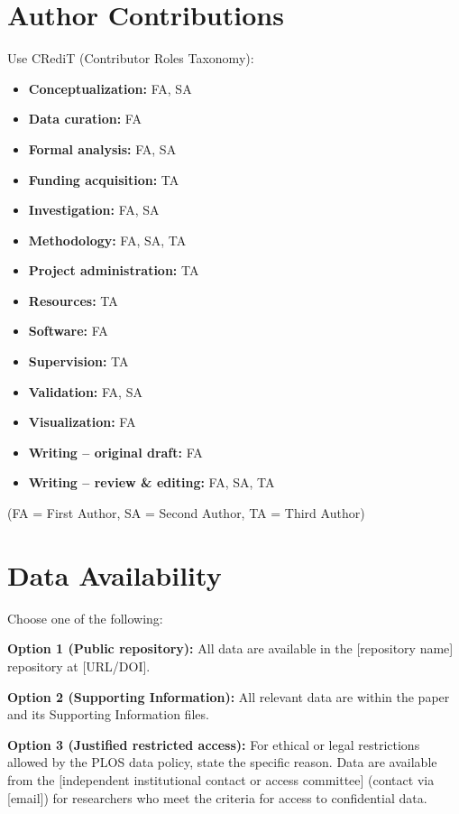 \documentclass[10pt,letterpaper]{article}
\begin{document}
\section*{Author Contributions}

Use CRediT (Contributor Roles Taxonomy):
\begin{itemize}
    \item \textbf{Conceptualization:} FA, SA
    \item \textbf{Data curation:} FA
    \item \textbf{Formal analysis:} FA, SA
    \item \textbf{Funding acquisition:} TA
    \item \textbf{Investigation:} FA, SA
    \item \textbf{Methodology:} FA, SA, TA
    \item \textbf{Project administration:} TA
    \item \textbf{Resources:} TA
    \item \textbf{Software:} FA
    \item \textbf{Supervision:} TA
    \item \textbf{Validation:} FA, SA
    \item \textbf{Visualization:} FA
    \item \textbf{Writing – original draft:} FA
    \item \textbf{Writing – review \& editing:} FA, SA, TA
\end{itemize}

(FA = First Author, SA = Second Author, TA = Third Author)

\section*{Data Availability}

Choose one of the following:

\textbf{Option 1 (Public repository):} 
All data are available in the [repository name] repository at [URL/DOI].

\textbf{Option 2 (Supporting Information):}
All relevant data are within the paper and its Supporting Information files.

\textbf{Option 3 (Justified restricted access):}
For ethical or legal restrictions allowed by the PLOS data policy, state the specific reason. Data are available from the [independent institutional contact or access committee] (contact via [email]) for researchers who meet the criteria for access to confidential data.
\end{document}
